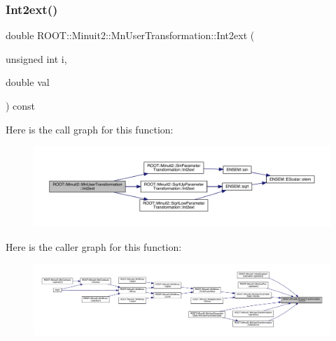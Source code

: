 \mbox{\label{classROOT_1_1Minuit2_1_1MnUserTransformation_aa05e327d2e4376c0e1db865ba92becdd}} 
\subsubsection{\texorpdfstring{Int2ext()}{Int2ext()}\hspace{0.1cm}{\footnotesize\ttfamily [3/3]}}
{\footnotesize\ttfamily double R\+O\+O\+T\+::\+Minuit2\+::\+Mn\+User\+Transformation\+::\+Int2ext (\begin{DoxyParamCaption}\item[{unsigned int}]{i,  }\item[{double}]{val }\end{DoxyParamCaption}) const}

Here is the call graph for this function\+:
\nopagebreak
\begin{figure}[H]
\begin{center}
\leavevmode
\includegraphics[width=350pt]{d9/d98/classROOT_1_1Minuit2_1_1MnUserTransformation_aa05e327d2e4376c0e1db865ba92becdd_cgraph}
\end{center}
\end{figure}
Here is the caller graph for this function\+:
\nopagebreak
\begin{figure}[H]
\begin{center}
\leavevmode
\includegraphics[width=350pt]{d9/d98/classROOT_1_1Minuit2_1_1MnUserTransformation_aa05e327d2e4376c0e1db865ba92becdd_icgraph}
\end{center}
\end{figure}
\mbox{\label{classROOT_1_1Minuit2_1_1MnUserTransformation_a10f2146be0a2c991243dd2f70a943a15}} 
